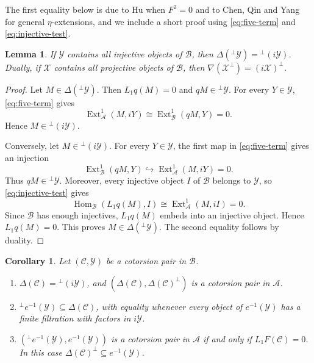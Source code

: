 \documentclass[11pt]{amsart}
\newtheorem{lemma}[theorem]{Lemma}
\newtheorem{corollary}[theorem]{Corollary}
\theoremstyle{definition}
\theoremstyle{remark}
\theoremstyle{plain}
\numberwithin{equation}{section}
\begin{document}
The first equality below is due to Hu \cite[Lemma~3.8]{Hu} when $F^2=0$ and to Chen, Qin and Yang \cite[Lemma~3.3]{ChenQinYang} for general $\eta$-extensions, and we include a short proof using \eqref{eq:five-term} and \eqref{eq:injective-test}.


\begin{lemma}\label{lem:structural-orthogonality}
	If $\mathcal{Y}$ contains all injective objects of $\mathcal{B}$, then
	$\Delta({}^\perp\mathcal{Y}) = {}^\perp(i\mathcal{Y})$.
	Dually, if $\mathcal{X}$ contains all projective objects of $\mathcal{B}$, then
	$\nabla(\mathcal{X}^\perp) = (i\mathcal{X})^\perp$.
\end{lemma}

\begin{proof}
	Let $M\in\Delta({}^\perp\mathcal{Y})$. Then $L_1q(M)=0$ and $qM\in{}^\perp\mathcal{Y}$. For every $Y\in\mathcal{Y}$,
	\eqref{eq:five-term} gives
	\[
	\operatorname{Ext}^1_{\mathcal{A}}(M,iY)
	\cong \operatorname{Ext}^1_{\mathcal{B}}(qM,Y)=0.
	\]
	Hence $M\in{}^\perp(i\mathcal{Y})$.
	
	Conversely, let $M\in{}^\perp(i\mathcal{Y})$. For every $Y\in\mathcal{Y}$, the first map in \eqref{eq:five-term} gives an
	injection
	\[
	\operatorname{Ext}^1_{\mathcal{B}}(qM,Y)
	\hookrightarrow \operatorname{Ext}^1_{\mathcal{A}}(M,iY)=0.
	\]
	Thus $qM\in{}^\perp\mathcal{Y}$. Moreover, every injective object $I$ of $\mathcal{B}$ belongs to $\mathcal{Y}$, so
	\eqref{eq:injective-test} gives
	\[
	\operatorname{Hom}_{\mathcal{B}}(L_1q(M),I)
	\cong \operatorname{Ext}^1_{\mathcal{A}}(M,iI)=0.
	\]
	Since $\mathcal{B}$ has enough injectives, $L_1q(M)$ embeds into an injective object. Hence $L_1q(M)=0$. This proves
	$M\in\Delta({}^\perp\mathcal{Y})$. The second equality follows by duality.
\end{proof}

\begin{corollary}\label{cor:any-eta}
Let $(\mathcal{C}, \mathcal{Y})$ be a cotorsion pair in $\mathcal{B}$.
\begin{enumerate}
 \item $\Delta(\mathcal{C}) = {}^\perp(i\mathcal{Y})$, and $(\Delta(\mathcal{C}), \Delta(\mathcal{C})^\perp)$
 is a cotorsion pair in $\mathcal{A}$.
 \item ${}^\perp e^{-1}(\mathcal{Y}) \subseteq \Delta(\mathcal{C})$, with equality whenever
 every object of $e^{-1}(\mathcal{Y})$ has a finite filtration with factors in
 $i\mathcal{Y}$.
 \item  $({}^\perp e^{-1}(\mathcal{Y}), e^{-1}(\mathcal{Y}))$ is a
 cotorsion pair in $\mathcal{A}$ if and only if $L_1F(\mathcal{C}) = 0$. In this case
 $\Delta(\mathcal{C})^\perp \subseteq e^{-1}(\mathcal{Y})$.
\end{enumerate}
\end{corollary}
\end{document}
